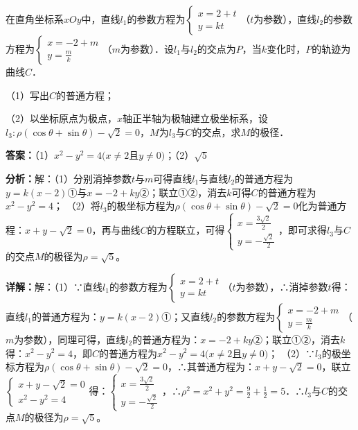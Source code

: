 \begin{question}[points=10]
在直角坐标系$xOy$中，直线$l_1$的参数方程为$\begin{cases} x=2+t \\ y=kt \end{cases}$（$t$为参数），直线$l_2$的参数方程为$\begin{cases} x=-2+m \\ y=\frac{m}{k} \end{cases}$（$m$为参数）．设$l_1$与$l_2$的交点为$P$，当$k$变化时，$P$的轨迹为曲线$C$．

（1）写出$C$的普通方程；

（2）以坐标原点为极点，$x$轴正半轴为极轴建立极坐标系，设$l_3:\rho(\cos\theta+\sin\theta)-\sqrt{2}=0$，$M$为$l_3$与$C$的交点，求$M$的极径．
\begin{solution}
\textbf{答案：}（1）$x^2-y^2=4(x\neq 2$且$y\neq 0)$；（2）$\sqrt{5}$

\textbf{分析：}解：（1）分别消掉参数$t$与$m$可得直线$l_1$与直线$l_2$的普通方程为$y=k(x-2)$①与$x=-2+ky$②；联立①②，消去$k$可得$C$的普通方程为$x^2-y^2=4$；
（2）将$l_3$的极坐标方程为$\rho(\cos\theta+\sin\theta)-\sqrt{2}=0$化为普通方程：$x+y-\sqrt{2}=0$，再与曲线$C$的方程联立，可得$\begin{cases} x=\frac{3\sqrt{2}}{2} \\ y=-\frac{\sqrt{2}}{2} \end{cases}$，即可求得$l_3$与$C$的交点$M$的极径为$\rho=\sqrt{5}$。

\textbf{详解：}解：（1）∵直线$l_1$的参数方程为$\begin{cases} x=2+t \\ y=kt \end{cases}$（$t$为参数），∴消掉参数$t$得：直线$l_1$的普通方程为：$y=k(x-2)$①；又直线$l_2$的参数方程为$\begin{cases} x=-2+m \\ y=\frac{m}{k} \end{cases}$（$m$为参数），同理可得，直线$l_2$的普通方程为：$x=-2+ky$②；联立①②，消去$k$得：$x^2-y^2=4$，即$C$的普通方程为$x^2-y^2=4(x\neq 2$且$y\neq 0)$；
（2）∵$l_3$的极坐标方程为$\rho(\cos\theta+\sin\theta)-\sqrt{2}=0$，∴其普通方程为：$x+y-\sqrt{2}=0$，联立$\begin{cases} x+y-\sqrt{2}=0 \\ x^2-y^2=4 \end{cases}$得：$\begin{cases} x=\frac{3\sqrt{2}}{2} \\ y=-\frac{\sqrt{2}}{2} \end{cases}$，∴$\rho^2=x^2+y^2=\frac{9}{2}+\frac{1}{2}=5$．∴$l_3$与$C$的交点$M$的极径为$\rho=\sqrt{5}$。
\end{solution}
\end{question}


